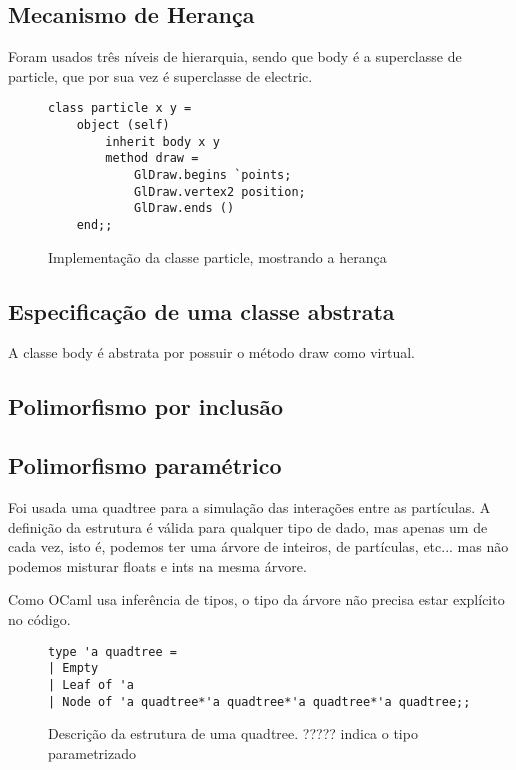 \documentclass[a4paper,10pt]{article}
\begin{document}
\subsection{Mecanismo de Herança}
	Foram usados três níveis de hierarquia, sendo que body é a superclasse de particle, que por sua vez é superclasse de electric.

	\begin{figure}[H]
	\centering	
	\begin{lstlisting}
class particle x y =
	object (self)
		inherit body x y
		method draw =
			GlDraw.begins `points;
			GlDraw.vertex2 position;
			GlDraw.ends ()
	end;;
	\end{lstlisting}
	\caption{Implementação da classe particle, mostrando a herança}
\end{figure}

\subsection{Especificação de uma classe abstrata}
	A classe body é abstrata por possuir o método draw como virtual.

\subsection{Polimorfismo por inclusão}
	
\subsection{Polimorfismo paramétrico}
	
		Foi usada uma quadtree para a simulação das interações entre as partículas. A definição da estrutura é válida para qualquer tipo de dado, mas apenas um de cada vez, isto é, podemos ter uma árvore de inteiros, de partículas, etc... mas não podemos misturar floats e ints na mesma árvore.
		
		Como OCaml usa inferência de tipos, o tipo da árvore não precisa estar explícito no código.
		
	\begin{figure}[H]
	\centering	
	\begin{lstlisting}
type 'a quadtree =
| Empty
| Leaf of 'a
| Node of 'a quadtree*'a quadtree*'a quadtree*'a quadtree;;
	\end{lstlisting}
	\caption{Descrição da estrutura de uma quadtree. ????? indica o tipo parametrizado }
	\end{figure}
	
\end{document}
